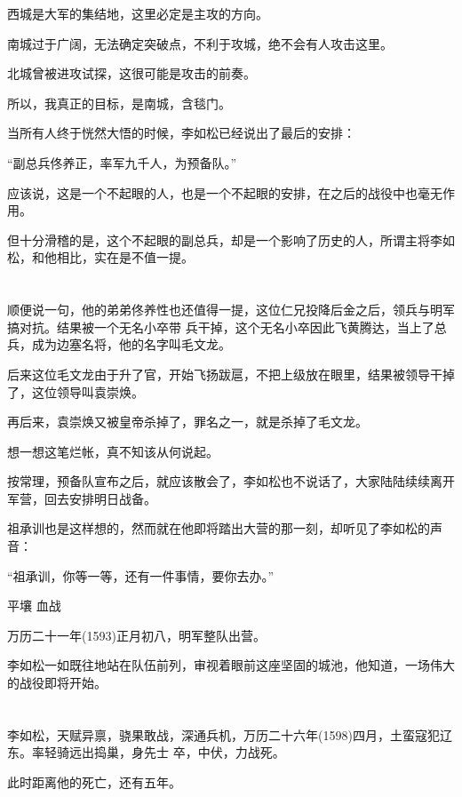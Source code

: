 \documentclass[11pt,a4paper,onecolumn]{article}
\begin{document}
西城是大军的集结地，这里必定是主攻的方向。

南城过于广阔，无法确定突破点，不利于攻城，绝不会有人攻击这里。

北城曾被进攻试探，这很可能是攻击的前奏。

所以，我真正的目标，是南城，含毯门。

当所有人终于恍然大悟的时候，李如松已经说出了最后的安排：

``副总兵佟养正，率军九千人，为预备队。''

应该说，这是一个不起眼的人，也是一个不起眼的安排，在之后的战役中也毫无作用。

但十分滑稽的是，这个不起眼的副总兵，却是一个影响了历史的人，所谓主将李如松，和他相比，实在是不值一提。

\section[\thesection]{}

顺便说一句，他的弟弟佟养性也还值得一提，这位仁兄投降后金之后，领兵与明军搞对抗。结果被一个无名小卒带
兵干掉，这个无名小卒因此飞黄腾达，当上了总兵，成为边塞名将，他的名字叫毛文龙。

后来这位毛文龙由于升了官，开始飞扬跋扈，不把上级放在眼里，结果被领导干掉了，这位领导叫袁崇焕。

再后来，袁崇焕又被皇帝杀掉了，罪名之一，就是杀掉了毛文龙。

想一想这笔烂帐，真不知该从何说起。

按常理，预备队宣布之后，就应该散会了，李如松也不说话了，大家陆陆续续离开军营，回去安排明日战备。

祖承训也是这样想的，然而就在他即将踏出大营的那一刻，却听见了李如松的声音：

``祖承训，你等一等，还有一件事情，要你去办。''

平壤 血战

万历二十一年(1593)正月初八，明军整队出营。

李如松一如既往地站在队伍前列，审视着眼前这座坚固的城池，他知道，一场伟大的战役即将开始。

\section[\thesection]{}

李如松，天赋异禀，骁果敢战，深通兵机，万历二十六年(1598)四月，土蛮寇犯辽东。率轻骑远出捣巢，身先士
卒，中伏，力战死。

此时距离他的死亡，还有五年。
\end{document}
